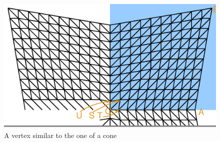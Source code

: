 \begin{figure}[ht] \centering
  \includegraphics[width=130mm]{butterfly.eps}
  \caption{A vertex similar to the one of a cone}
  \label{\numb section 7.\numb fig 8}
\end{figure}

